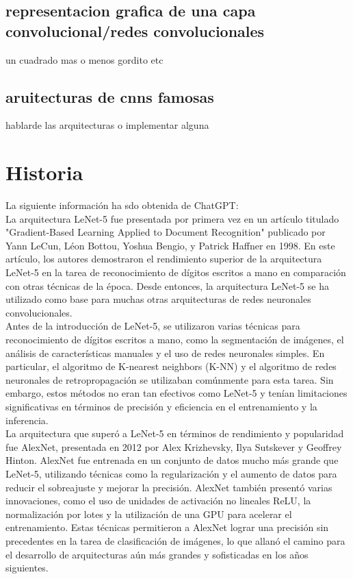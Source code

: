 \documentclass{article}
\begin{document}
\subsection{representacion grafica de una capa convolucional/redes convolucionales}
un cuadrado mas o menos gordito etc

\subsection{aruitecturas de cnns famosas}
hablarde las arquitecturas o implementar alguna


\section{Historia}

La siguiente información ha sdo obtenida de ChatGPT:\\


La arquitectura LeNet-5 fue presentada por primera vez en un artículo titulado "Gradient-Based Learning Applied to Document Recognition" publicado por Yann LeCun, Léon Bottou, Yoshua Bengio, y Patrick Haffner en 1998. En este artículo, los autores demostraron el rendimiento superior de la arquitectura LeNet-5 en la tarea de reconocimiento de dígitos escritos a mano en comparación con otras técnicas de la época. Desde entonces, la arquitectura LeNet-5 se ha utilizado como base para muchas otras arquitecturas de redes neuronales convolucionales.\\


Antes de la introducción de LeNet-5, se utilizaron varias técnicas para reconocimiento de dígitos escritos a mano, como la segmentación de imágenes, el análisis de características manuales y el uso de redes neuronales simples. En particular, el algoritmo de K-nearest neighbors (K-NN) y el algoritmo de redes neuronales de retropropagación se utilizaban comúnmente para esta tarea. Sin embargo, estos métodos no eran tan efectivos como LeNet-5 y tenían limitaciones significativas en términos de precisión y eficiencia en el entrenamiento y la inferencia.\\


La arquitectura que superó a LeNet-5 en términos de rendimiento y popularidad fue AlexNet, presentada en 2012 por Alex Krizhevsky, Ilya Sutskever y Geoffrey Hinton. AlexNet fue entrenada en un conjunto de datos mucho más grande que LeNet-5, utilizando técnicas como la regularización y el aumento de datos para reducir el sobreajuste y mejorar la precisión. AlexNet también presentó varias innovaciones, como el uso de unidades de activación no lineales ReLU, la normalización por lotes y la utilización de una GPU para acelerar el entrenamiento. Estas técnicas permitieron a AlexNet lograr una precisión sin precedentes en la tarea de clasificación de imágenes, lo que allanó el camino para el desarrollo de arquitecturas aún más grandes y sofisticadas en los años siguientes.\\
\end{document}
